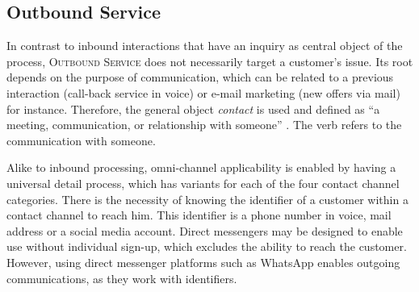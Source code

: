 	 
	 
	 
	 
	 
	 
	 \subsection{Outbound Service}
	 
	 In contrast to inbound interactions that have an inquiry as central object of the process, \textsc{Outbound Service} does not necessarily target a customer's issue. Its root depends on the purpose of communication, which can be related to a previous interaction (call-back service in voice) or e-mail marketing (new offers via mail) for instance. Therefore, the general object \textit{contact} is used and defined as \enquote{a meeting, communication, or relationship with someone} \citep{oxfordcontact}. The verb refers to the communication with someone.
	 
	 Alike to inbound processing, omni-channel applicability is enabled by having a universal detail process, which has variants for each of the four contact channel categories. There is the necessity of knowing the identifier of a customer within a contact channel to reach him. This identifier is a phone number in voice, mail address or a social media account. Direct messengers may be designed to enable use without individual sign-up, which excludes the ability to reach the customer. However, using direct messenger platforms such as WhatsApp enables outgoing communications, as they work with identifiers. 
	 
